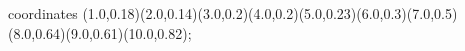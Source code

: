 					coordinates { (1.0,0.18)(2.0,0.14)(3.0,0.2)(4.0,0.2)(5.0,0.23)(6.0,0.3)(7.0,0.5)(8.0,0.64)(9.0,0.61)(10.0,0.82)};
